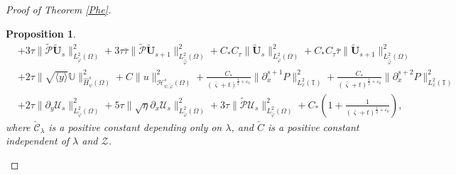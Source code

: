 \documentclass[10pt,a4paper]{amsart}
\newtheorem{prop}{Proposition}
\newcommand\y{{{\langle y \rangle}}}
\begin{document}
\begin{proof}[Proof of Theorem \ref{Phe}]
\begin{prop}
\begin{align}
    &+3\tau\|\tilde{\mathcal{P}}\tilde{\mathbf{U}}_{s}\|_{L_{\tilde{\varphi}}^{2}(\Omega)}^{2}
     +3\tau\bar{\tau}\|\tilde{\mathcal{P}}\tilde{\mathbf{U}}_{s+1}\|_{L_{\tilde{\hat{\varphi}}}^{2}(\Omega)}^{2}
     +C_{*}C_{\tau}\|\tilde{\mathbf{U}}_{s}\|_{L_{\tilde{\varphi}}^{2}(\Omega)}^{2}
     +C_{*}C_{\tau}\bar{\tau}\|\tilde{\mathbf{U}}_{s+1}\|_{L_{\tilde{\hat{\varphi}}}^{2}(\Omega)}^{2}\nonumber\\
    &+2\tau\|\sqrt{\y}\mathbb{U}\|_{\hat{H}_{\psi}^{s}(\Omega)}^{2}
     +C\|u\|_{\mathcal{H}_{\psi,\tilde{\varphi}}^{s}(\Omega)}^{2}
     +\frac{C_{*}}{(\bar{\varsigma}+t)^{\frac{1}{2}+\varepsilon_{0}}}\|\partial_{x}^{s+1}P\|_{L_{x}^{2}(\mathbb{T})}^{2}
     +\frac{C_{*}}{(\bar{\varsigma}+t)^{\frac{1}{2}+\varepsilon_{0}}}\|\partial_{x}^{s+2}P\|_{L_{x}^{2}(\mathbb{T})}^{2}\nonumber\\
    &+2\tau\|\partial_{y}\mathcal{U}_{s}\|_{L_{\tilde{\varphi}}^{2}(\Omega)}^{2}
     +5\tau\|\sqrt{\eta}\partial_{x}\mathcal{U}_{s}\|_{L_{\tilde{\varphi}}^{2}(\Omega)}^{2}
     +3\tau\|\tilde{\mathcal{P}}\mathcal{U}_{s}\|_{L_{\tilde{\varphi}}^{2}(\Omega)}^{2}
     +C_{*}\left(1+\frac{1}{(\bar{\varsigma}+t)^{\frac{1}{2}+\varepsilon_{0}}}\right),\nonumber
\end{align}
where $\check{\mathcal{C}}_{\lambda}$ is a positive constant depending only on $\lambda$, and $\check{C}$ is a positive constant independent of $\lambda$ and $\mathcal{Z}$.
\end{prop}


\end{proof}
\end{document}

